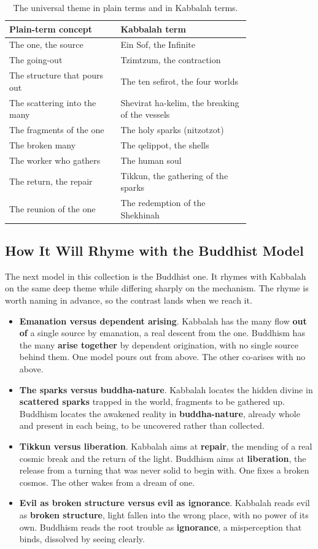 \begin{longtable}{L{0.36\linewidth} L{0.42\linewidth}}
\caption{The universal theme in plain terms and in Kabbalah terms.}\\
\toprule
\textbf{Plain-term concept} & \textbf{Kabbalah term} \\
\midrule
The one, the source & Ein Sof, the Infinite \\
The going-out & Tzimtzum, the contraction \\
The structure that pours out & The ten sefirot, the four worlds \\
The scattering into the many & Shevirat ha-kelim, the breaking of the vessels \\
The fragments of the one & The holy sparks (nitzotzot) \\
The broken many & The qelippot, the shells \\
The worker who gathers & The human soul \\
The return, the repair & Tikkun, the gathering of the sparks \\
The reunion of the one & The redemption of the Shekhinah \\
\bottomrule
\end{longtable}

\subsection{How It Will Rhyme with the Buddhist Model}

The next model in this collection is the Buddhist one. It rhymes with Kabbalah on
the same deep theme while differing sharply on the mechanism. The rhyme is worth
naming in advance, so the contrast lands when we reach it.

\begin{itemize}
 \item \textbf{Emanation versus dependent arising}. Kabbalah has the many flow
 \textbf{out of} a single source by emanation, a real descent from the one.
 Buddhism has the many \textbf{arise together} by dependent origination,
 with no single source behind them. One model pours out from above. The
 other co-arises with no above.
 \item \textbf{The sparks versus buddha-nature}. Kabbalah locates the hidden
 divine in \textbf{scattered sparks} trapped in the world, fragments to be
 gathered up. Buddhism locates the awakened reality in
 \textbf{buddha-nature}, already whole and present in each being, to be
 uncovered rather than collected.
 \item \textbf{Tikkun versus liberation}. Kabbalah aims at \textbf{repair}, the
 mending of a real cosmic break and the return of the light. Buddhism aims
 at \textbf{liberation}, the release from a turning that was never solid to
 begin with. One fixes a broken cosmos. The other wakes from a dream of
 one.
 \item \textbf{Evil as broken structure versus evil as ignorance}. Kabbalah
 reads evil as \textbf{broken structure}, light fallen into the wrong place,
 with no power of its own. Buddhism reads the root trouble as
 \textbf{ignorance}, a misperception that binds, dissolved by seeing
 clearly.
\end{itemize}

